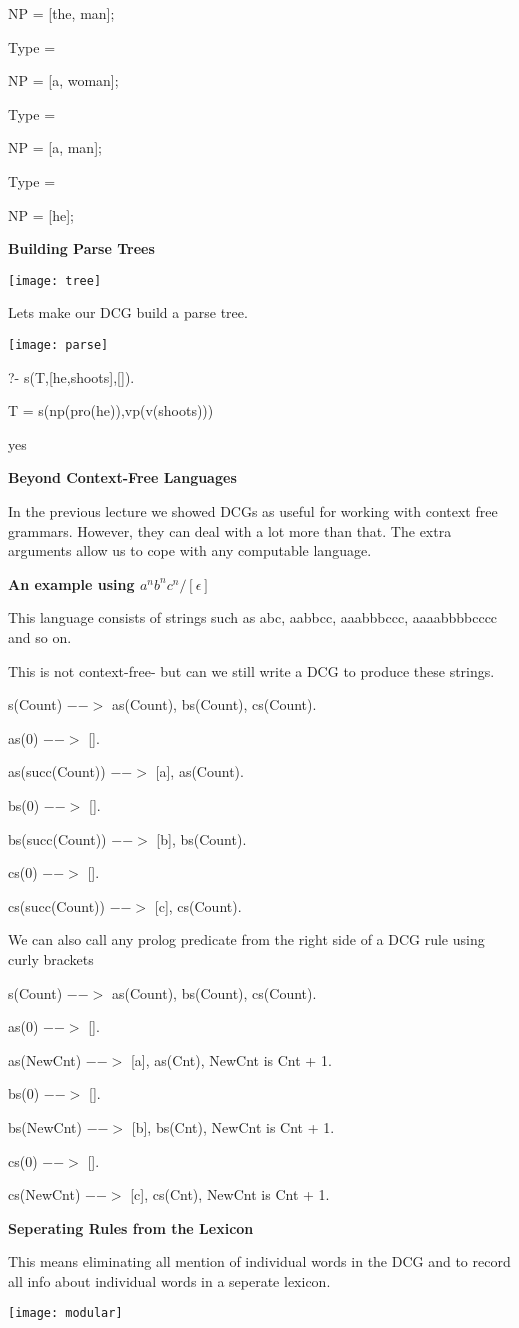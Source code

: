 \documentclass{article}
\begin{document}
NP = [the, man];

Type =\textunderscore

NP = [a, woman];

Type =\textunderscore

NP = [a, man];

Type =\textunderscore

NP = [he];


\textbf{Building Parse Trees}

\texttt{[image: tree]}

Lets make our DCG build a parse tree.


\texttt{[image: parse]}

?- s(T,[he,shoots],[]).

T = s(np(pro(he)),vp(v(shoots)))

yes


\textbf{Beyond Context-Free Languages}

In the previous lecture we showed DCGs as useful for working with context free grammars. However, they can deal with a lot more than that. The extra arguments allow us to cope with any computable language.



\textbf{An example using $a^nb^nc^n / [\epsilon] $ }

This language consists of strings such as abc, aabbcc, aaabbbccc, aaaabbbbcccc and so on.

This is not context-free- but can we still write a DCG to produce these strings.


s(Count) $-->$ as(Count), bs(Count), cs(Count).


as(0) $-->$ [].

as(succ(Count)) $-->$ [a], as(Count).


bs(0) $-->$ [].

bs(succ(Count)) $-->$ [b], bs(Count).


cs(0) $-->$ [].

cs(succ(Count)) $-->$ [c], cs(Count).


We can also call any prolog predicate from the right side of a DCG rule using curly brackets { }


s(Count) $-->$ as(Count), bs(Count), cs(Count).


as(0) $-->$ [].

as(NewCnt) $-->$ [a], as(Cnt), {NewCnt is Cnt + 1}.


bs(0) $-->$ [].

bs(NewCnt) $-->$ [b], bs(Cnt), {NewCnt is Cnt + 1}.


cs(0) $-->$ [].

cs(NewCnt) $-->$ [c], cs(Cnt), {NewCnt is Cnt + 1}.



\textbf{Seperating Rules from the Lexicon}

This means eliminating all mention of individual words in the DCG and to record all info about individual words in a seperate lexicon.


\texttt{[image: modular]}
\end{document}
